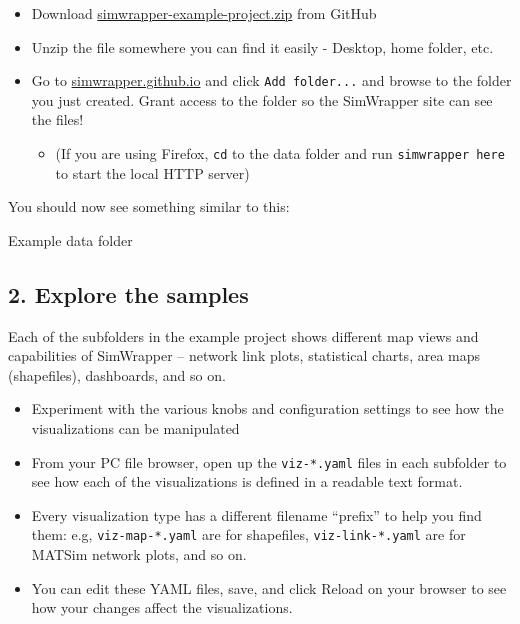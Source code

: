 \begin{itemize}
\tightlist
\item
  Download
  \href{https://github.com/simwrapper/simwrapper-example-project/archive/refs/heads/main.zip}{simwrapper-example-project.zip}
  from GitHub
\item
  Unzip the file somewhere you can find it easily - Desktop, home
  folder, etc.
\item
  Go to \href{https://simwrapper.github.io/site}{simwrapper.github.io}
  and click \texttt{Add\ folder...} and browse to the folder you just
  created. Grant access to the folder so the SimWrapper site can see the
  files!

  \begin{itemize}
  \tightlist
  \item
    (If you are using Firefox, \texttt{cd} to the data folder and run
    \texttt{simwrapper\ here} to start the local HTTP server)
  \end{itemize}
\end{itemize}

You should now see something similar to this:

Example data folder

\hypertarget{explore-the-samples}{%
\subsection{2. Explore the samples}\label{explore-the-samples}}

Each of the subfolders in the example project shows different map views
and capabilities of SimWrapper -- network link plots, statistical
charts, area maps (shapefiles), dashboards, and so on.

\begin{itemize}
\tightlist
\item
  Experiment with the various knobs and configuration settings to see
  how the visualizations can be manipulated
\item
  From your PC file browser, open up the \texttt{viz-*.yaml} files in
  each subfolder to see how each of the visualizations is defined in a
  readable text format.
\item
  Every visualization type has a different filename ``prefix'' to help
  you find them: e.g, \texttt{viz-map-*.yaml} are for shapefiles,
  \texttt{viz-link-*.yaml} are for MATSim network plots, and so on.
\item
  You can edit these YAML files, save, and click Reload on your browser
  to see how your changes affect the visualizations.
\end{itemize}

